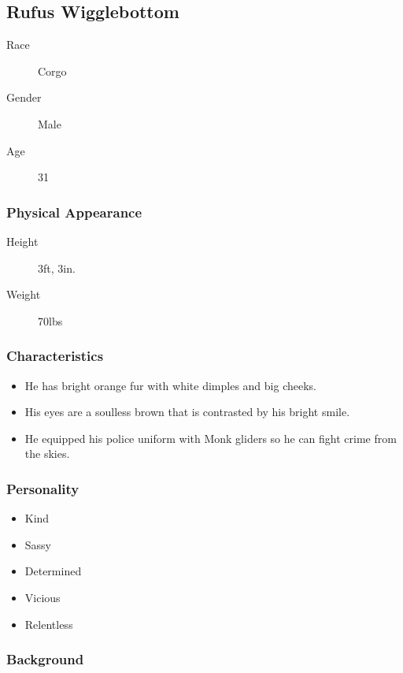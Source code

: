 \pagebreak

\subsection{Rufus Wigglebottom}

\begin{description}
    \item[Race] Corgo
    \item[Gender] Male
    \item[Age] 31  
\end{description}

\subsubsection{Physical Appearance}

\begin{description}
    \item[Height] 3ft, 3in.
    \item[Weight] 70lbs
\end{description}

\subsubsection{Characteristics}

\begin{itemize}
    \item He has bright orange fur with white dimples and big cheeks.
    \item His eyes are a soulless brown that is contrasted by his bright smile.
    \item He equipped his police uniform with Monk gliders so he can fight crime from the skies.
\end{itemize}

\subsubsection{Personality}

\begin{itemize}
    \item Kind
    \item Sassy
    \item Determined
    \item Vicious
    \item Relentless
\end{itemize}

\subsubsection{Background}

